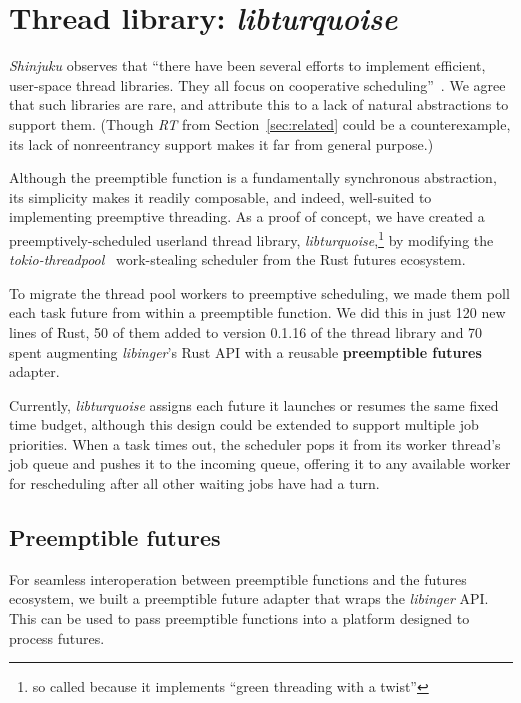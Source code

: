 \section{Thread library: \textit{libturquoise}}
\label{sec:libturquoise}

\textit{Shinjuku} observes that ``there have been several efforts to implement
efficient, user-space thread libraries.  They all focus on cooperative
scheduling''~\cite{Kaffes:nsdi2019}.  We agree that such libraries are rare, and
attribute this to a lack of natural abstractions to support them.  (Though
\textit{RT} from Section~\ref{sec:related} could be a counterexample, its lack of
nonreentrancy support makes it far from general purpose.)

Although the preemptible function is a fundamentally synchronous abstraction, its
simplicity makes it readily composable, and indeed, well-suited to implementing
preemptive threading.  As a proof of concept, we have created a
preemptively-scheduled userland thread library, \textit{libturquoise},\footnote{so
called because it implements ``green threading with a twist''} by modifying the
\textit{tokio-threadpool}~\cite{www-tokio-threadpool} work-stealing scheduler from
the Rust futures ecosystem.

To migrate the thread pool workers to preemptive scheduling, we made them poll each
task future from within a preemptible function.  We did this in
just 120 new lines of Rust, 50 of them added to version 0.1.16 of the thread library
and
70 spent augmenting \textit{libinger}'s Rust API with a reusable \textbf{preemptible
futures} adapter.

Currently, \textit{libturquoise} assigns each future it launches or resumes the same
fixed time budget, although this design could be extended to support
multiple job priorities.  When a task times out, the scheduler pops it from its
worker thread's job queue and pushes it to the incoming queue,
offering it to any available worker for rescheduling after all other waiting jobs
have had a turn.


\subsection{Preemptible futures}

For seamless interoperation between preemptible functions and the futures ecosystem,
we built a preemptible future adapter that wraps the \textit{libinger} API.  This
can be used to pass preemptible functions into a platform designed to process
futures.

